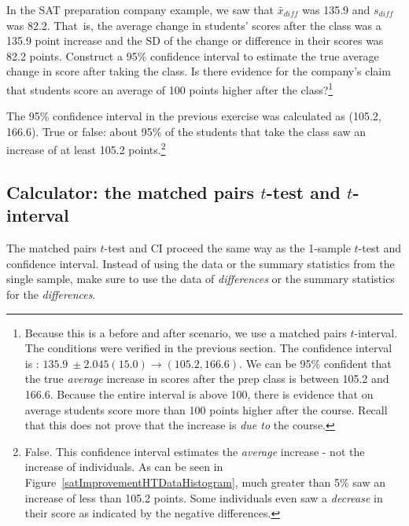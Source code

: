 \begin{exercise}In the SAT preparation company example, we saw that $\bar{x}_{diff}$ was 135.9 and $s_{diff}$ was 82.2. That~is, the average change in students' scores after the class was a 135.9 point increase and the SD of the change or difference in their scores was 82.2 points. Construct a 95\% confidence interval to estimate the true average change in score after taking the class. Is there evidence for the company's claim that students score an average of 100 points higher after the class?\footnote{Because this is a before and after scenario, we use a matched pairs $t$-interval. The conditions were verified in the previous section. The confidence interval is : $135.9\ \pm 2.045(15.0) \to (105.2, 166.6)$. We can be 95\% confident that the true \emph{average} increase in scores after the prep class is between 105.2 and 166.6. Because the entire interval is above 100, there is evidence that on average students score more than 100 points higher after the course. Recall that this does not prove that the increase is \emph{due to}  the course.}
\end{exercise}

\begin{exercise}The 95\% confidence interval in the previous exercise was calculated as (105.2, 166.6). True or false: about 95\% of the students that take the class saw an increase of at least 105.2 points.\footnote{False. This confidence interval estimates the \emph{average} increase - not the increase of individuals. As can be seen in Figure~\ref{satImprovementHTDataHistogram}, much greater than 5\% saw an increase of less than 105.2 points. Some individuals even saw a \emph{decrease} in their score as indicated by the negative differences.}
\end{exercise}


\subsection{Calculator: the matched pairs $t$-test and $t$-interval}

The matched pairs $t$-test and CI proceed the same way as the 1-sample $t$-test and confidence interval. Instead of using the data or the summary statistics from the single sample, make sure to use the data of \emph{differences} or the summary statistics for the \emph{differences}.

